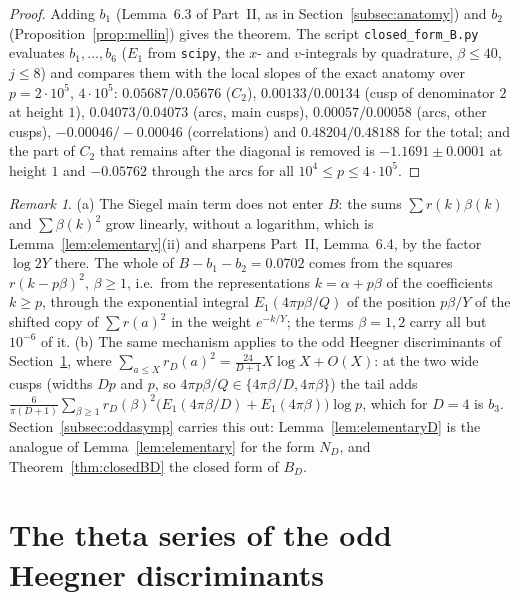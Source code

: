 \documentclass[11pt]{amsart}
\theoremstyle{remark}
\newtheorem{remark}[theorem]{Remark}
\begin{document}
\begin{proof}
Adding $b_1$ (Lemma~6.3 of Part~II, as in Section~\ref{subsec:anatomy}) and $b_2$ (Proposition~\ref{prop:mellin}) gives the theorem. The script \texttt{closed\_form\_B.py} evaluates $b_1,\dots,b_6$ ($E_1$ from \texttt{scipy}, the $x$- and $v$-integrals by quadrature, $\beta\le40$, $j\le8$) and compares them with the local slopes of the exact anatomy over $p=2\cdot10^5$, $4\cdot10^5$: $0.05687/0.05676$ ($C_2$), $0.00133/0.00134$ (cusp of denominator $2$ at height $1$), $0.04073/0.04073$ (arcs, main cusps), $0.00057/0.00058$ (arcs, other cusps), $-0.00046/-0.00046$ (correlations) and $0.48204/0.48188$ for the total; and the part of $C_2$ that remains after the diagonal is removed is $-1.1691\pm0.0001$ at height $1$ and $-0.05762$ through the arcs for all $10^4\le p\le4\cdot10^5$.
\end{proof}

\begin{remark}
(a) The Siegel main term does not enter $B$: the sums $\sum r(k)\beta(k)$ and $\sum\beta(k)^2$ grow linearly, without a logarithm, which is Lemma~\ref{lem:elementary}(ii) and sharpens Part~II, Lemma~6.4, by the factor $\log 2Y$ there. The whole of $B-b_1-b_2=0.0702$ comes from the squares $r(k-p\beta)^2$, $\beta\ge1$, i.e.\ from the representations $k=\alpha+p\beta$ of the coefficients $k\ge p$, through the exponential integral $E_1(4\pi p\beta/Q)$ of the position $p\beta/Y$ of the shifted copy of $\sum r(a)^2$ in the weight $e^{-k/Y}$; the terms $\beta=1,2$ carry all but $10^{-6}$ of it. (b) The same mechanism applies to the odd Heegner discriminants of Section~\ref{sec:heegner}, where $\sum_{a\le X}r_D(a)^2=\frac{24}{D+1}X\log X+O(X)$: at the two wide cusps (widths $Dp$ and $p$, so $4\pi p\beta/Q\in\{4\pi\beta/D,4\pi\beta\}$) the tail adds $\frac{6}{\pi(D+1)}\sum_{\beta\ge1}r_D(\beta)^2\bigl(E_1(4\pi\beta/D)+E_1(4\pi\beta)\bigr)\log p$, which for $D=4$ is $b_3$. Section~\ref{subsec:oddasymp} carries this out: Lemma~\ref{lem:elementaryD} is the analogue of Lemma~\ref{lem:elementary} for the form $N_D$, and Theorem~\ref{thm:closedBD} the closed form of $B_D$.
\end{remark}

\section{The theta series of the odd Heegner discriminants}\label{sec:heegner}
\end{document}
